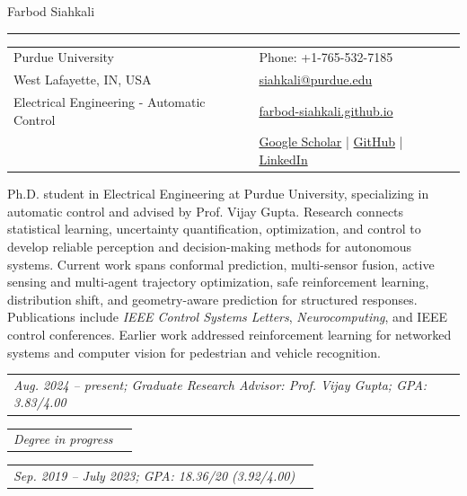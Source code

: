 \documentclass[letterpaper,10pt]{article}
\makeatletter
\newcommand{\cvsection}[1]{%
  \Needspace{4\baselineskip}%
  \par\addvspace{11pt}%
  \noindent\marginpar{\vspace{1pt}\RaggedRight\small\scshape #1}%
  \ignorespaces
}
\newcommand{\degreeentry}[5]{%
  \Needspace{4\baselineskip}%
  \noindent\begin{tabularx}{\linewidth}{@{}X >{\raggedleft\arraybackslash}p{1.55in}@{}}
    \textbf{#1} & #2\\[-1pt]
    #3 & #4\\[-1pt]
    \multicolumn{2}{@{}p{\linewidth}@{}}{\textit{#5}}
  \end{tabularx}\par\vspace{5pt}%
}
\makeatother
\begin{document}
\begin{adjustwidth}{-1.39in}{0in}
{\fontsize{23}{25}\selectfont Farbod Siahkali}\par
\vspace{3pt}\hrule\vspace{7pt}
\begin{tabularx}{\linewidth}{@{}X >{\raggedleft\arraybackslash}X@{}}
Purdue University & Phone: +1-765-532-7185\\
West Lafayette, IN, USA & \href{mailto:siahkali@purdue.edu}{siahkali@purdue.edu}\\
Electrical Engineering - Automatic Control & \href{https://farbod-siahkali.github.io/}{farbod-siahkali.github.io}\\
& \href{https://scholar.google.com/citations?hl=en\&user=-99KSTsAAAAJ}{Google Scholar} \; | \; \href{https://github.com/Farbod-Siahkali}{GitHub} \; | \; \href{https://www.linkedin.com/in/farbod-siahkali/}{LinkedIn}
\end{tabularx}
\end{adjustwidth}

\cvsection{Summary}
Ph.D. student in Electrical Engineering at Purdue University, specializing in automatic control and advised by Prof. Vijay Gupta. Research connects statistical learning, uncertainty quantification, optimization, and control to develop reliable perception and decision-making methods for autonomous systems. Current work spans conformal prediction, multi-sensor fusion, active sensing and multi-agent trajectory optimization, safe reinforcement learning, distribution shift, and geometry-aware prediction for structured responses. Publications include \textit{IEEE Control Systems Letters}, \textit{Neurocomputing}, and IEEE control conferences. Earlier work addressed reinforcement learning for networked systems and computer vision for pedestrian and vehicle recognition.

\cvsection{Education}
\degreeentry{Ph.D., Electrical Engineering (Automatic Control)}{Expected May 2029}
{Purdue University}{West Lafayette, IN}
{Aug. 2024 -- present; Graduate Research Advisor: Prof. Vijay Gupta; GPA: 3.83/4.00}

\degreeentry{M.S., Electrical Engineering}{Expected December 2026}
{Purdue University}{West Lafayette, IN}
{Degree in progress}

\degreeentry{B.S., Electrical Engineering (Control Engineering)}{July 2023}
{University of Tehran}{Tehran, Iran}
{Sep. 2019 -- July 2023; GPA: 18.36/20 (3.92/4.00)}
\end{document}
